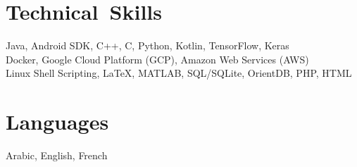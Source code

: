 \section{Technical~Skills}
Java, Android SDK, C++, C, Python, Kotlin, TensorFlow, Keras\\
Docker, Google Cloud Platform (GCP), Amazon Web Services (AWS)\\
Linux Shell Scripting, LaTeX, MATLAB,
SQL/SQLite, OrientDB, PHP, HTML
\section{Languages}
Arabic, English, French
